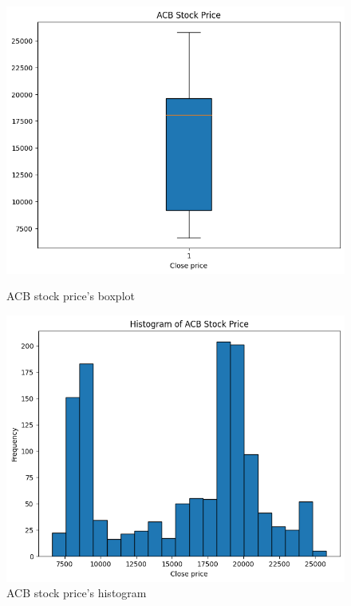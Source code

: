 \documentclass{ieeeojies}
\begin{document}
\begin{figure}[H]
    \centering
    \begin{minipage}{0.23\textwidth}
    \centering
    \includegraphics[width=1\textwidth]{bibliography/boxplot_acb.png}
    \caption{ACB stock price's boxplot}
    \label{fig:1}
    \end{minipage}
    \hfill
    \begin{minipage}{0.23\textwidth}
    \centering
    \includegraphics[width=1\textwidth]{bibliography/histogram_acb.png}
    \caption{ACB stock price's histogram}
    \label{fig:2}
    \end{minipage}
\end{figure}
\end{document}
